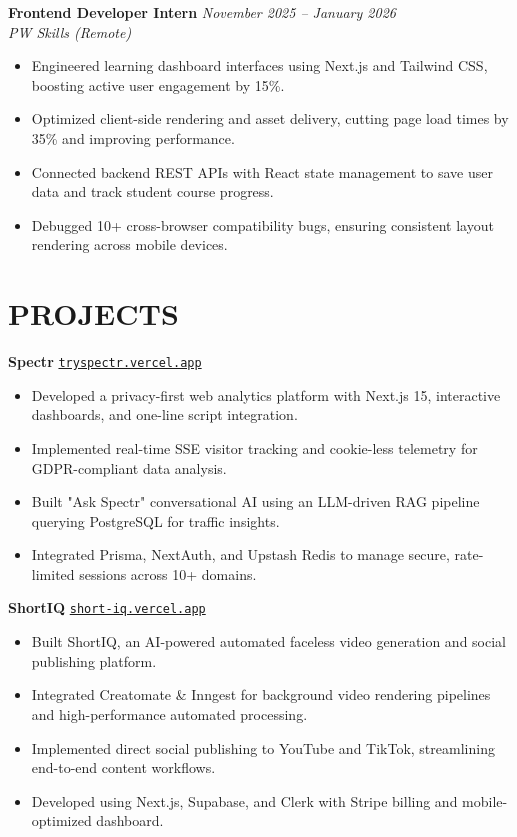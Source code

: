 \documentclass[a4paper,11pt]{article}
\begin{document}
\textbf{Frontend Developer Intern} \hfill \textit{November 2025 -- January 2026}\\
\textit{PW Skills (Remote)}
\begin{itemize}
    \item Engineered learning dashboard interfaces using Next.js and Tailwind CSS, boosting active user engagement by 15\%.
    \item Optimized client-side rendering and asset delivery, cutting page load times by 35\% and improving performance.
    \item Connected backend REST APIs with React state management to save user data and track student course progress.
    \item Debugged 10+ cross-browser compatibility bugs, ensuring consistent layout rendering across mobile devices.
\end{itemize}

\section*{PROJECTS}
\vspace{2pt}
\textbf{Spectr} \hfill \href{https://tryspectr.vercel.app}{\texttt{tryspectr.vercel.app}}
\begin{itemize}
    \item Developed a privacy-first web analytics platform with Next.js 15, interactive dashboards, and one-line script integration.
    \item Implemented real-time SSE visitor tracking and cookie-less telemetry for GDPR-compliant data analysis.
    \item Built "Ask Spectr" conversational AI using an LLM-driven RAG pipeline querying PostgreSQL for traffic insights.
    \item Integrated Prisma, NextAuth, and Upstash Redis to manage secure, rate-limited sessions across 10+ domains.
\end{itemize}

 \vspace{3pt}

 \textbf{ShortIQ} \hfill \href{https://short-iq.vercel.app}{\texttt{short-iq.vercel.app}}
\begin{itemize}
    \item Built ShortIQ, an AI-powered automated faceless video generation and social publishing platform.
    \item Integrated Creatomate \& Inngest for background video rendering pipelines and high-performance automated processing.
    \item Implemented direct social publishing to YouTube and TikTok, streamlining end-to-end content workflows.
    \item Developed using Next.js, Supabase, and Clerk with Stripe billing and mobile-optimized dashboard.
\end{itemize}
\end{document}
